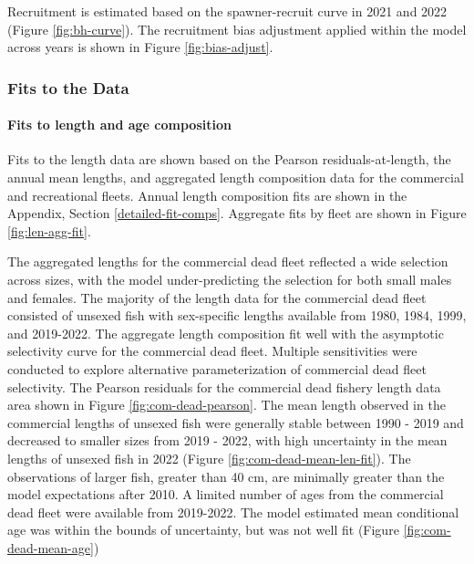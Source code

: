\documentclass[11pt,
  english,
  letterpaper,
]{article}
\begin{document}
Recruitment is estimated based on the spawner-recruit curve in 2021 and 2022 (Figure \ref{fig:bh-curve}). The recruitment bias adjustment applied within the model across years is shown in Figure \ref{fig:bias-adjust}.

\hypertarget{fits-to-the-data}{%
\subsubsection{Fits to the Data}\label{fits-to-the-data}}

\hypertarget{fits-to-length-and-age-composition}{%
\paragraph{Fits to length and age composition}\label{fits-to-length-and-age-composition}}

Fits to the length data are shown based on the Pearson residuals-at-length, the annual mean lengths, and aggregated length composition data for the commercial and recreational fleets. Annual length composition fits are shown in the Appendix, Section \ref{detailed-fit-comps}. Aggregate fits by fleet are shown in Figure \ref{fig:len-agg-fit}.

The aggregated lengths for the commercial dead fleet reflected a wide selection across sizes, with the model under-predicting the selection for both small males and females. The majority of the length data for the commercial dead fleet consisted of unsexed fish with sex-specific lengths available from 1980, 1984, 1999, and 2019-2022. The aggregate length composition fit well with the asymptotic selectivity curve for the commercial dead fleet. Multiple sensitivities were conducted to explore alternative parameterization of commercial dead fleet selectivity. The Pearson residuals for the commercial dead fishery length data area shown in Figure \ref{fig:com-dead-pearson}. The mean length observed in the commercial lengths of unsexed fish were generally stable between 1990 - 2019 and decreased to smaller sizes from 2019 - 2022, with high uncertainty in the mean lengths of unsexed fish in 2022 (Figure \ref{fig:com-dead-mean-len-fit}). The observations of larger fish, greater than 40 cm, are minimally greater than the model expectations after 2010. A limited number of ages from the commercial dead fleet were available from 2019-2022. The model estimated mean conditional age was within the bounds of uncertainty, but was not well fit (Figure \ref{fig:com-dead-mean-age})
\end{document}
